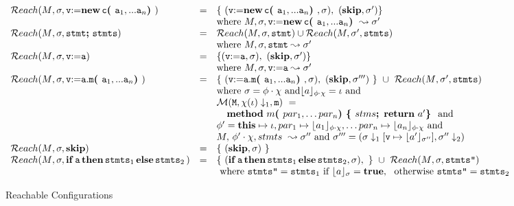 {\begin{figure*}
$
\begin{array}{lcl}
  \\
 \Reach(\M{}, \sigma, \prg{v}\kw{:=} \kw{new}\, \clss{}\lp \prg{a}_1,...\prg{a}_n \rp) & = &  \{ \ ( \prg{v}\kw{:=}\kw{new}\, \clss{}\lp \prg{a}_1,...\prg{a}_n \rp,\sigma), \ ( \kw{skip}, \sigma' ) \}
 \\
 & &  \mbox{where }  \M,\sigma, \prg{v}\kw{:=} \kw{new}\, \clss{}\lp \prg{a}_1,...\prg{a}_n \rp \leadsto \sigma'
 \\
\Reach(\M{}, \sigma,\prg{stmt}\semi\prg{stmts}) & = &
\Reach(\M,\sigma,\prg{stmt}) \cup \Reach(\M, \sigma',\prg{stmts})
\\ & & \mbox{where }  \M,\sigma, \prg{stmt} \leadsto \sigma'
\\
\Reach(\M{}, \sigma,\prg{v}\kw{:=}\prg{a}) & = &
 \{ ( \prg{v}\kw{:=}\prg{a}, \sigma), \ ( \kw{skip}, \sigma' ) \}
 \\
 & &  \mbox{where }  \M,\sigma, \prg{v}\kw{:=} \prg{a} \leadsto \sigma'
\\

\Reach(\M{}, \sigma,\prg{v} \kw{:=} \prg{a}\kw{.}\prg{m}\lp \prg{a}_1,...\prg{a}_n \rp) & = &
\{ \ (\prg{v} \kw{:=}\prg{a}\kw{.}\prg{m}\lp \prg{a}_1,...\prg{a}_n \rp, \sigma ) , \ ({\kw {skip}}, \sigma''' ) \  \} \ \cup
\ \Reach(\M{}, \sigma',\prg{stmts}) \\
& &  \mbox{where}\ \sigma = \phi \cdot\chi\ \mbox{and}
 \interp{\syntax{a}}{\phi\cdot\chi} = \iota\ \mbox{and} \\
& & \Meths {} {$\chi(\iota)\downarrow_1$} {m} \  =  \\
& &  ~ \hspace{.1in} \kw{method}\ m\lp par_1, \ldots par_n \rp
 \lb stms \semi\, \kw{return}\ \syntax{a}' \rb
\ \mbox{and}\\
& & \phi'=\this \mapsto \iota, par_1 \mapsto  \interp{{\syntax{a}}_1}{\phi\cdot\chi}, \ldots par_n \mapsto  \interp{{\syntax{a}}_n}{\phi\cdot\chi}
\ \mbox{and}\\
& & \M,\, \phi'\cdot\chi, stmts \ \leadsto  \sigma''
\ \mbox{and} \ \sigma'''= (\sigma\downarrow_1[\prg{v} \mapsto \interp{a'}{\sigma''}],  \sigma''\downarrow_2)
\\
\Reach(\M{}, \sigma,{\kw {skip}}) & = &
\{ \ ({\kw {skip}}, \sigma ) \  \}   \\
\Reach(\M{}, \sigma,{\kw {if}}\, \prg{a}\, {\kw {then}}\, \prg{stmts}_1\, {\kw {else}}\, \prg{stmts}_2\, ) & = &
\{ \ ( {\kw {if}}\, \prg{a}\, {\kw {then}}\, \prg{stmts}_1\, {\kw {else}}\, \prg{stmts}_2, \sigma ) , \  \}  \  \cup \
\Reach(\M{}, \sigma,\prg{stmts''})\\
& & \mbox{ where } \prg{stmts''}=\prg{stmts}_1 \mbox{ if } \interp{a}{\sigma}={\kw {true}},\ \mbox{ otherwise }
\prg{stmts''}=\prg{stmts}_2
\end{array}
$
\caption{Reachable Configurations\label{fig:reach}}
\end{figure*}


}
